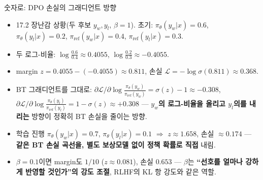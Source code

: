 \documentclass[aspectratio=169,11pt]{beamer}
\begin{document}
\begin{frame}{숫자로: DPO 손실의 그래디언트 방향}
  \small
  \begin{itemize}
    \item 17.2 장난감 상황(두 후보 $y_w, y_l$, $\beta =
      1$). 초기: $\pi_\theta(y_w|x) = 0.6$,
      $\pi_\theta(y_l|x) = 0.2$, $\pi_{\text{ref}}(y_w|x)
      = 0.4$, $\pi_{\text{ref}}(y_l|x) = 0.3$.
    \item 두 로그-비율: $\log \tfrac{0.6}{0.4} \approx
      0.4055$, \; $\log \tfrac{0.2}{0.3} \approx -0.4055$.
    \item margin $z = 0.4055 - (-0.4055) \approx 0.811$,
      손실 $\mathcal{L} = -\log\sigma(0.811) \approx
      \mathbf{0.368}$.
    \item BT 그래디언트를 그대로:
      $\partial \mathcal{L}/\partial \log
      \tfrac{\pi_\theta(y_w)}{\pi_{\text{ref}}(y_w)} =
      \sigma(z) - 1 \approx -0.308$,
      $\partial \mathcal{L}/\partial \log
      \tfrac{\pi_\theta(y_l)}{\pi_{\text{ref}}(y_l)} =
      1 - \sigma(z) \approx +0.308$ — \textbf{$y_w$의
      로그-비율을 올리고 $y_l$의를 내리는} 방향이 정확히 BT
      손실을 줄이는 방향.
    \item 학습 진행 $\pi_\theta(y_w|x) = 0.7$,
      $\pi_\theta(y_l|x) = 0.1$ $\Rightarrow$ $z \approx
      1.658$, 손실 $\approx 0.174$ — \textbf{같은 BT 손실
      곡선을, 별도 보상모델 없이 정책 확률로 직접} 내림.
    \item $\beta = 0.1$이면 margin도 $1/10$ ($z \approx
      0.081$), 손실 $0.653$ — $\beta$는 \textbf{``선호를
      얼마나 강하게 반영할 것인가''의 강도 조절}, RLHF의
      KL 항 강도와 같은 역할.
  \end{itemize}
\end{frame}
\end{document}

